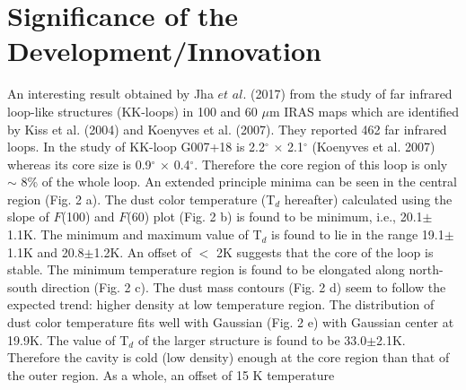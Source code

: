 \documentclass[fleqn,a4paper,12pt,oneside]{article}
\begin{document}
\section{Significance of the Development/Innovation}
An interesting result obtained by  Jha $et$ $al.$ (2017) from the study of far infrared loop-like structures (KK-loops) in 100 and 60 $\mu$m IRAS maps which are identified by Kiss et al. (2004) and Koenyves et al. (2007). They reported 462 far infrared loops. In the study of  KK-loop G007+18 is 2.2$^{\circ}$ $\times$
2.1$^{\circ}$ (Koenyves et al. 2007) whereas its core size is
0.9$^{\circ}$ $\times$ 0.4$^{\circ}$. Therefore the core region of
this loop is only $\sim$ 8\% of the whole loop. An extended
principle minima can be seen in the central region (Fig. 2 a). The
dust color temperature (T$_{d}$ hereafter) calculated using the
slope of $F$(100) and $F$(60) plot (Fig. 2 b) is found to be
minimum, i.e., 20.1$\pm$1.1K. The minimum and maximum value of
T$_{d}$ is found to lie in the range 19.1$\pm$1.1K and
20.8$\pm$1.2K. An offset of $<$ 2K suggests that the core of the
loop is stable. The minimum temperature region is found to be
elongated along north-south direction (Fig. 2 c). The dust mass
contours (Fig. 2 d) seem to follow the expected trend: higher
density at low temperature region.
The distribution of dust color temperature fits well with Gaussian
(Fig. 2 e) with Gaussian center at 19.9K. The value of T$_{d}$ of
the larger structure is found to be 33.0$\pm$2.1K. Therefore the
cavity is cold (low density) enough at the core region than that
of the outer region. As a whole, an offset of 15 K temperature
\end{document}
